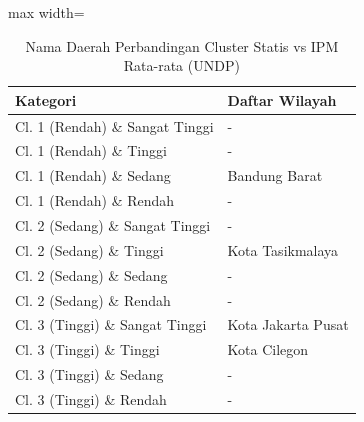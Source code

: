 \begin{table}[H]
\centering
\caption{Nama Daerah Perbandingan Cluster Statis vs IPM Rata-rata (UNDP)} \label{tab:samplestatis_ipm_avg_name}
\begin{adjustbox}{max width=\textwidth}
\begin{tabular}{|p{4cm}|p{10cm}|}
\hline
\textbf{Kategori} & \textbf{Daftar Wilayah} \\
\hline
Cl. 1 (Rendah) \& Sangat Tinggi & - \\
\hline
Cl. 1 (Rendah) \& Tinggi & - \\
\hline
Cl. 1 (Rendah) \& Sedang & Bandung Barat \\
\hline
Cl. 1 (Rendah) \& Rendah & - \\
\hline
Cl. 2 (Sedang) \& Sangat Tinggi & - \\
\hline
Cl. 2 (Sedang) \& Tinggi & Kota Tasikmalaya \\
\hline
Cl. 2 (Sedang) \& Sedang & - \\
\hline
Cl. 2 (Sedang) \& Rendah & - \\
\hline
Cl. 3 (Tinggi) \& Sangat Tinggi & Kota Jakarta Pusat \\
\hline
Cl. 3 (Tinggi) \& Tinggi & Kota Cilegon \\
\hline
Cl. 3 (Tinggi) \& Sedang & - \\
\hline
Cl. 3 (Tinggi) \& Rendah & - \\
\hline
\end{tabular}
\end{adjustbox}
\end{table}